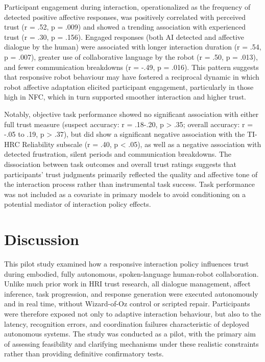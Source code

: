 \documentclass[
]{article}
\begin{document}
Participant engagement during interaction, operationalized as the
frequency of detected positive affective responses, was positively
correlated with perceived trust (r = .52, p = .009) and showed a
trending association with experienced trust (r = .30, p = .156). Engaged
responses (both AI detected and affective dialogue by the human) were
associated with longer interaction duration (r = .54, p = .007), greater
use of collaborative language by the robot (r = .50, p = .013), and
fewer communication breakdowns (r = -.49, p = .016). This pattern
suggests that responsive robot behaviour may have fostered a reciprocal
dynamic in which robot affective adaptation elicited participant
engagement, particularly in those high in NFC, which in turn supported
smoother interaction and higher trust.

Notably, objective task performance showed no significant association
with either full trust measure (suspect accuracy: r = .18-.20, p
\textgreater{} .35; overall accuracy: r = -.05 to .19, p \textgreater{}
.37), but did show a significant negative association with the TI-HRC
Reliability subscale (r = .40, p \textless{} .05), as well as a negative
association with detected frustration, silent periods and communication
breakdowns. The dissociation between task outcomes and overall trust
ratings suggests that participants' trust judgments primarily reflected
the quality and affective tone of the interaction process rather than
instrumental task success. Task performance was not included as a
covariate in primary models to avoid conditioning on a potential
mediator of interaction policy effects.

\section{Discussion}\label{discussion}

This pilot study examined how a responsive interaction policy influences
trust during embodied, fully autonomous, spoken-language human-robot
collaboration. Unlike much prior work in HRI trust research, all
dialogue management, affect inference, task progression, and response
generation were executed autonomously and in real time, without
Wizard-of-Oz control or scripted repair. Participants were therefore
exposed not only to adaptive interaction behaviour, but also to the
latency, recognition errors, and coordination failures characteristic of
deployed autonomous systems. The study was conducted as a pilot, with
the primary aim of assessing feasibility and clarifying mechanisms under
these realistic constraints rather than providing definitive
confirmatory tests.
\end{document}
